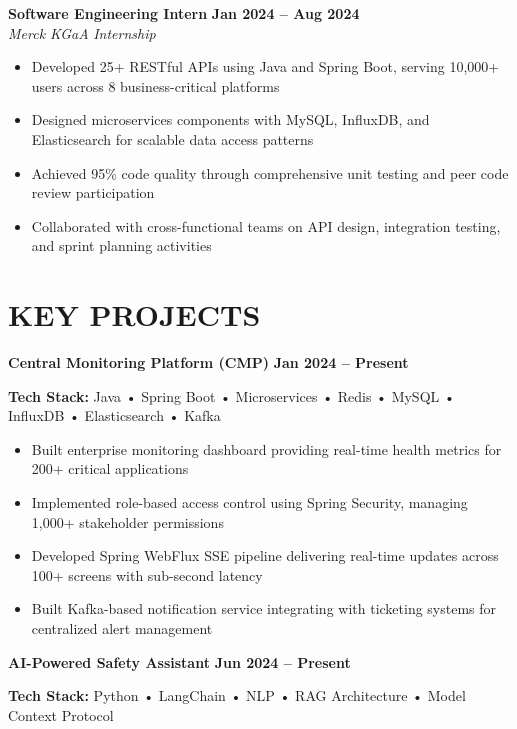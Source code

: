\documentclass[10pt,a4paper]{article}
\newcommand{\experience}[4]{%
    \textbf{#1} \hfill \textbf{#2}\\
    \textit{#3} \hfill \textit{#4}\vspace{1pt}%
}
\newcommand{\project}[2]{\textbf{#1} \hfill \textbf{#2}\vspace{1pt}}
\begin{document}
\vspace{2pt}

\experience{Software Engineering Intern}{Jan 2024 -- Aug 2024}{Merck KGaA}{Internship}
\begin{itemize}[leftmargin=1.3em, itemsep=0pt, parsep=0pt, topsep=1pt]
    \item Developed 25+ RESTful APIs using Java and Spring Boot, serving 10,000+ users across 8 business-critical platforms
    \item Designed microservices components with MySQL, InfluxDB, and Elasticsearch for scalable data access patterns
    \item Achieved 95\% code quality through comprehensive unit testing and peer code review participation
    \item Collaborated with cross-functional teams on API design, integration testing, and sprint planning activities
\end{itemize}

\section*{KEY PROJECTS}

\project{Central Monitoring Platform (CMP)}{Jan 2024 -- Present}

\textbf{Tech Stack:} Java • Spring Boot • Microservices • Redis • MySQL • InfluxDB • Elasticsearch • Kafka

\begin{itemize}[leftmargin=1.3em, itemsep=0pt, parsep=0pt, topsep=1pt]
    \item Built enterprise monitoring dashboard providing real-time health metrics for 200+ critical applications
    \item Implemented role-based access control using Spring Security, managing 1,000+ stakeholder permissions
    \item Developed Spring WebFlux SSE pipeline delivering real-time updates across 100+ screens with sub-second latency
    \item Built Kafka-based notification service integrating with ticketing systems for centralized alert management
\end{itemize}

\vspace{2pt}

\project{AI-Powered Safety Assistant}{Jun 2024 -- Present}

\textbf{Tech Stack:} Python • LangChain • NLP • RAG Architecture • Model Context Protocol
\end{document}
